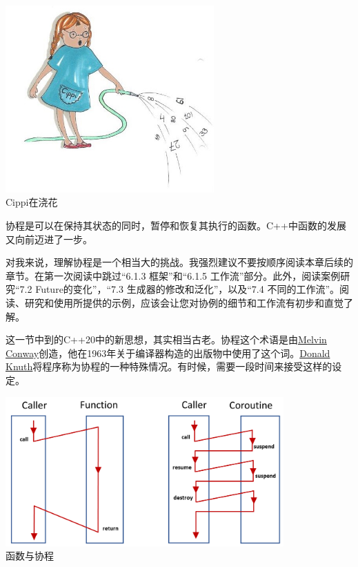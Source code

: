 \begin{center}
\includegraphics[width=0.6\textwidth]{content/3/chapter6/images/2.png}\\
Cippi在浇花
\end{center}

协程是可以在保持其状态的同时，暂停和恢复其执行的函数。C++中函数的发展又向前迈进了一步。

\begin{tcolorbox}[breakable,enhanced jigsaw,colback=red!5!white,colframe=red!75!black,title={挑战：理解协程}]
	
对我来说，理解协程是一个相当大的挑战。我强烈建议不要按顺序阅读本章后续的章节。在第一次阅读中跳过“6.1.3 框架”和“6.1.5 工作流”部分。此外，阅读案例研究“7.2 Future的变化”，“7.3 生成器的修改和泛化”，以及“7.4 不同的工作流”。阅读、研究和使用所提供的示例，应该会让您对协例的细节和工作流有初步和直觉了解。
	
\end{tcolorbox}

这一节中到的C++20中的新思想，其实相当古老。协程这个术语是由\href{https://en.wikipedia.org/wiki/Melvin_Conway}{Melvin Conway}创造，他在1963年关于编译器构造的出版物中使用了这个词。\href{https://en.wikipedia.org/wiki/Donald_Knuth}{Donald Knuth}将程序称为协程的一种特殊情况。有时候，需要一段时间来接受这样的设定。

\begin{center}
\includegraphics[width=0.8\textwidth]{content/3/chapter6/images/3.png}\\
函数与协程
\end{center}

